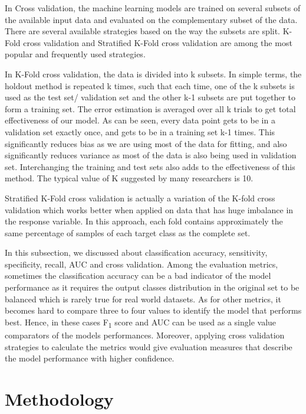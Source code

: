 \documentclass[11pt,openright]{report}
\begin{document}
In Cross validation, the machine learning models are trained on several subsets of the available input data and evaluated on the complementary subset of the data. There are several available strategies based on the way the subsets are split. K-Fold cross validation and Stratified K-Fold cross validation are among the most popular and frequently used strategies.

In K-Fold cross validation, the data is divided into k subsets. In simple terms, the holdout method is repeated k times, such that each time, one of the k subsets is used as the test set/ validation set and the other k-1 subsets are put together to form a training set. The error estimation is averaged over all k trials to get total effectiveness of our model. As can be seen, every data point gets to be in a validation set exactly once, and gets to be in a training set k-1 times. This significantly reduces bias as we are using most of the data for fitting, and also significantly reduces variance as most of the data is also being used in validation set. Interchanging the training and test sets also adds to the effectiveness of this method. The typical value of K suggested by many researchers is 10.

Stratified K-Fold cross validation is actually a variation of the K-fold cross validation which works better when applied on data that has huge imbalance in the response variable. In this approach, each fold contains approximately the same percentage of samples of each target class as the complete set.\newline

\noindent In this subsection, we discussed about classification accuracy, sensitivity, specificity, recall, AUC and cross validation. Among the evaluation metrics, sometimes the classification accuracy can be a bad indicator of the model performance as it requires the output classes distribution in the original set to be balanced which is rarely true for real world datasets. As for other metrics, it becomes hard to compare three to four values to identify the model that performs best. Hence, in these cases F\textsubscript1 score and AUC can be used as a single value comparators of the models performances. Moreover, applying cross validation strategies to calculate the metrics would give evaluation measures that describe the model performance with higher confidence.



\chapter{Methodology} \label{chapter:methodology}
\end{document}
